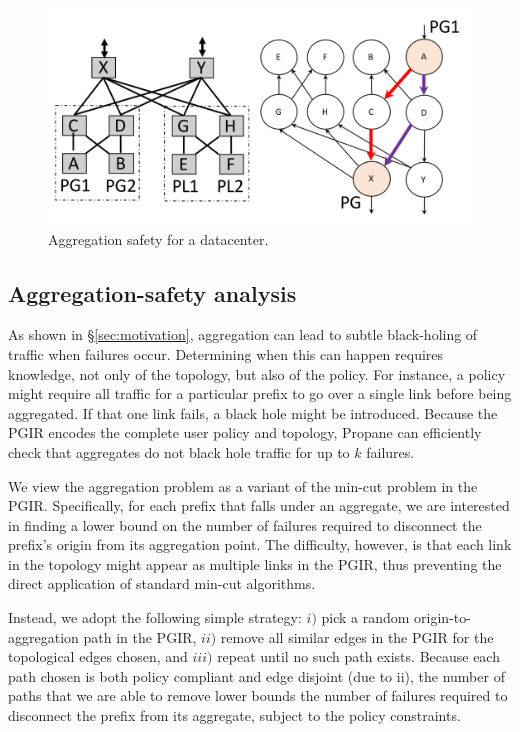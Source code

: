 \documentclass[10pt]{sigalternate052015}
\newcommand{\sysname}{{\small \sf Propane}\xspace}
\newcommand{\para}[1]{\paragraph*{\textbf{#1}}}
\begin{document}
\begin{figure}[t!]
  \centering
  \includegraphics[width=\columnwidth]{figures/aggregation}
  \caption{Aggregation safety for a datacenter.}
  \label{fig:aggregation-safety}
  \vspace{-1em}
\end{figure}

\subsection{Aggregation-safety analysis}

\label{sec:agg-safety}

As shown in \S\ref{sec:motivation}, aggregation can lead to subtle black-holing of traffic when failures occur. Determining when this can happen requires knowledge, not only of the topology, but also of the policy. For instance, a policy might require all traffic for a particular prefix to go over a single link before being aggregated. If that one link fails, a black hole might be introduced.
%
Because the PGIR encodes the complete user policy and topology, \sysname can efficiently check that aggregates do not black hole traffic for up to $k$ failures.

We view the aggregation problem as a variant of the min-cut problem in the PGIR. Specifically, for each prefix that falls under an aggregate, we are interested in finding a lower bound on the number of failures required to disconnect the prefix's origin from its aggregation point. The difficulty, however, is that each link in the topology might appear as multiple links in the PGIR, thus preventing the direct application of standard min-cut algorithms.
%

Instead, we adopt the following simple strategy: $i)$ pick a random origin-to-aggregation path in the PGIR, $ii)$ remove all similar edges in the PGIR for the topological edges chosen, and $iii)$ repeat until no such path exists.
Because each path chosen is both policy compliant and edge disjoint (due to ii), the number of paths that we are able to remove lower bounds the number of failures required to disconnect the prefix from its aggregate, subject to the policy constraints.
\end{document}
